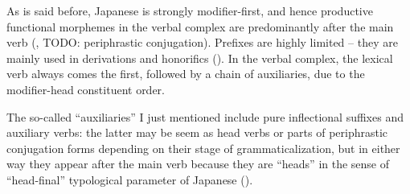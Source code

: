 \documentclass[UTF8, a4paper, oneside, scheme=plain]{ctexrep}
\begin{document}
As is said before, Japanese is strongly modifier-first,
and hence productive functional morphemes in the verbal complex are predominantly after the main verb
(, TODO: periphrastic conjugation).
Prefixes are highly limited -- they are mainly used in derivations and honorifics ().
In the verbal complex, the lexical verb always comes the first,
followed by a chain of auxiliaries,
due to the modifier-head constituent order.

The so-called ``auxiliaries'' I just mentioned include 
pure inflectional suffixes and auxiliary verbs:
the latter may be seem as head verbs or parts of periphrastic conjugation forms
depending on their stage of grammaticalization,
but in either way they appear after the main verb because they are ``heads'' 
in the sense of ``head-final'' typological parameter of Japanese ().
\end{document}
